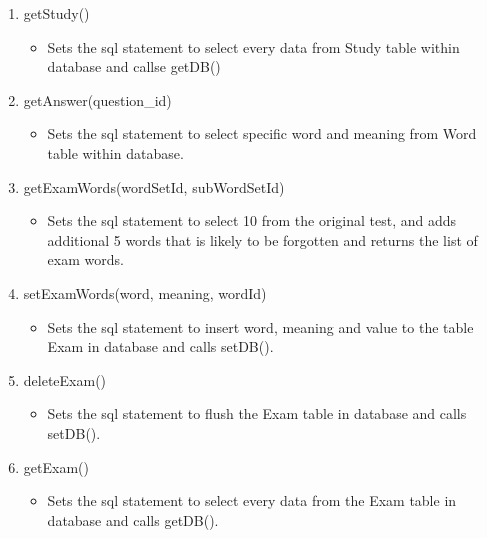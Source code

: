\documentclass[conference]{IEEEtran}
\begin{document}
\begin{enumerate}
\begin{enumerate}
\begin{enumerate}
\begin{enumerate}
                        \item getStudy()
                            \begin{itemize}
                                \item Sets the sql statement to select every data from Study table within database and callse getDB()
                            \end{itemize}
                        \item getAnswer(question\_id)
                            \begin{itemize}
                                \item Sets the sql statement to select specific word and meaning from Word table within database.
                            \end{itemize}
                        \item getExamWords(wordSetId, subWordSetId)
                            \begin{itemize}
                                \item Sets the sql statement to select 10 from the original test, and adds additional 5 words that is likely to be forgotten and returns the list of exam words.
                            \end{itemize}
                        \item setExamWords(word, meaning, wordId)
                            \begin{itemize}
                                \item Sets the sql statement to insert word, meaning and value to the table Exam in database and calls setDB().
                            \end{itemize}
                        \item deleteExam()
                            \begin{itemize}
                                \item Sets the sql statement to flush the Exam table in database and calls setDB().
                            \end{itemize}
                        \item getExam()
                            \begin{itemize}
                                \item Sets the sql statement to select every data from the Exam table in database and calls getDB().
                            \end{itemize}

\end{enumerate}
\end{enumerate}
\end{enumerate}
\end{enumerate}
\end{document}
